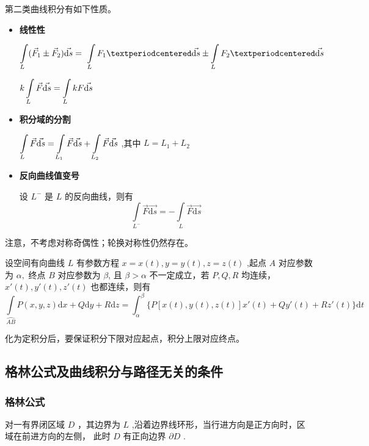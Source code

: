 第二类曲线积分有如下性质。
\begin{itemize}
    \item \textbf{线性性}
    
    $\dis \int\limits_L (\vec F_1\pm \vec F_2)\vec{\mathrm{d}s} = \
    \int\limits_L F_1·\vec{\mathrm{d}s} \pm \int\limits_LF_2·\vec{\mathrm{d}s} $ 

    $ \displaystyle k\int\limits_L \vec F\vec{\mathrm{d}s}
    = \int\limits_L kF\vec{\mathrm{d}s} $ 
    \item \textbf{积分域的分割}
    
    $\displaystyle \int\limits_L\vec F\vec{\mathrm{d}s} = 
    \int\limits_{L_1}\vec F\vec{\mathrm{d}s} + \int\limits_{L_2}\vec F\vec{\mathrm{d}s}$
    ,其中 $ L=L_1+L_2 $ 
    \item \textbf{反向曲线值变号}
    
    设 $ L^- $ 是 $ L $ 的反向曲线，则有$$
        \int\limits_{L^-}\vec F\vec{\mathrm{d}s}
        = -\int\limits_{L}\vec F\vec{\mathrm{d}s}
    $$ 
\end{itemize}

注意，不考虑对称奇偶性；轮换对称性仍然存在。


设空间有向曲线 $ L $ 有参数方程 $ x = x(t),y = y(t),z = z(t) $ ,起点 $ A $ 对应参数为 $ \alpha, $ 终点 $ B $ 
对应参数为 $ \beta $, 且 $ \beta > \alpha $ 不一定成立，若 $ P,Q,R $ 均连续，$ x'(t),y'(t),z'(t) $ 
也都连续，则有
$$
    \int\limits_{\wideparen{AB}}P(x,y,z)\mathrm{d}x+
    Q\mathrm{d}y + R\mathrm{d}z = 
    \int_\alpha^\beta \{P[x(t),y(t),z(t)]x'(t)+Qy'(t)+Rz'(t)\}\mathrm{d}t
$$ 

化为定积分后，要保证积分下限对应起点，积分上限对应终点。

\subsection{格林公式及曲线积分与路径无关的条件}

\subsubsection{格林公式}

\begin{Def}[正方向]

    对一有界闭区域 $ D $ ，其边界为 $ L $ ,沿着边界线环形，当行进方向是正方向时，区域在前进方向的左侧，
    此时 $ D $ 有正向边界 $ \partial D $ .
\end{Def}

